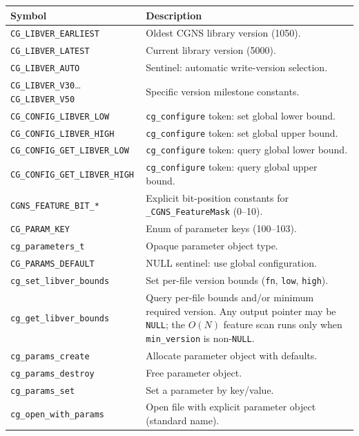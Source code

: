 \documentclass[11pt,letterpaper]{article}
\begin{document}
\begin{center}
\begin{longtable}{l p{8.5cm}}
\toprule
\textbf{Symbol} & \textbf{Description} \\
\midrule
\endhead
\texttt{CG\_LIBVER\_EARLIEST}   & Oldest CGNS library version (1050). \\
\texttt{CG\_LIBVER\_LATEST}     & Current library version (5000). \\
\texttt{CG\_LIBVER\_AUTO}       & Sentinel: automatic write-version selection. \\
\texttt{CG\_LIBVER\_V30}\ldots\texttt{CG\_LIBVER\_V50} & Specific version milestone constants. \\
\texttt{CG\_CONFIG\_LIBVER\_LOW}       & \texttt{cg\_configure} token: set global lower bound. \\
\texttt{CG\_CONFIG\_LIBVER\_HIGH}      & \texttt{cg\_configure} token: set global upper bound. \\
\texttt{CG\_CONFIG\_GET\_LIBVER\_LOW}  & \texttt{cg\_configure} token: query global lower bound. \\
\texttt{CG\_CONFIG\_GET\_LIBVER\_HIGH} & \texttt{cg\_configure} token: query global upper bound. \\
\texttt{CGNS\_FEATURE\_BIT\_*}  & Explicit bit-position constants for \texttt{\_CGNS\_FeatureMask} (0--10). \\
\texttt{CG\_PARAM\_KEY}         & Enum of parameter keys (100--103). \\
\texttt{cg\_parameters\_t}      & Opaque parameter object type. \\
\texttt{CG\_PARAMS\_DEFAULT}    & NULL sentinel: use global configuration. \\
\texttt{cg\_set\_libver\_bounds} & Set per-file version bounds (\texttt{fn}, \texttt{low}, \texttt{high}). \\
\texttt{cg\_get\_libver\_bounds} & Query per-file bounds and/or minimum required version.  Any output pointer may be \texttt{NULL}; the $O(N)$ feature scan runs only when \texttt{min\_version} is non-\texttt{NULL}. \\
\texttt{cg\_params\_create}     & Allocate parameter object with defaults. \\
\texttt{cg\_params\_destroy}    & Free parameter object. \\
\texttt{cg\_params\_set}        & Set a parameter by key/value. \\
\texttt{cg\_open\_with\_params} & Open file with explicit parameter object (standard name). \\

\end{longtable}
\end{center}
\end{document}
